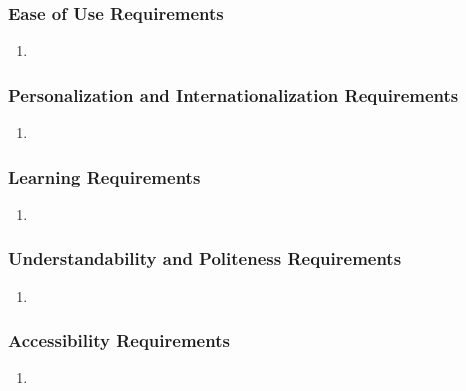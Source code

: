 \documentclass[]{article}
\begin{document}
\subsubsection{Ease of Use Requirements}
\label{ssub:ease_of_use_requirements}
\begin{enumerate}[{UH-EOU}1. ]
	\item 
\end{enumerate}

\subsubsection{Personalization and Internationalization Requirements}
\label{ssub:personalization_and_internationalization_requirements}
\begin{enumerate}[{UH-PI}1. ]
	\item 
\end{enumerate}

\subsubsection{Learning Requirements}
\label{ssub:learning_requirements}
\begin{enumerate}[{UH-L}1. ]
	\item 
\end{enumerate}

\subsubsection{Understandability and Politeness Requirements}
\label{ssub:understandability_and_politeness_requirements}
\begin{enumerate}[{UH-UP}1. ]
	\item 
\end{enumerate}

\subsubsection{Accessibility Requirements}
\label{ssub:accessibility_requirements}
\begin{enumerate}[{UH-A}1. ]
	\item 
\end{enumerate}

\end{document}
